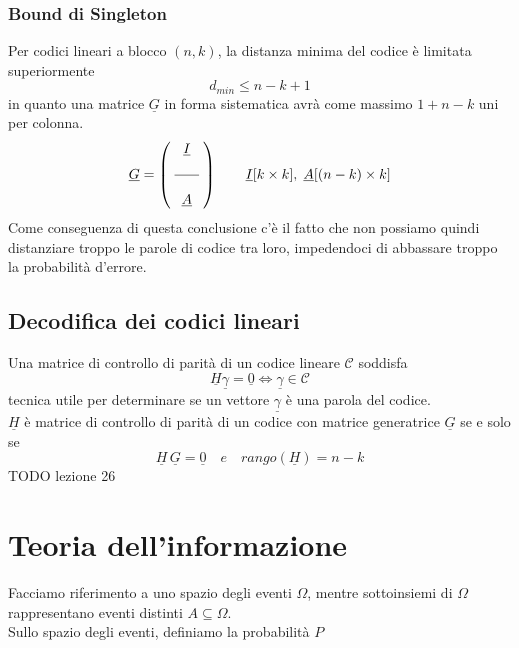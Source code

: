 \documentclass{article}
\begin{document}
\subsubsection{Bound di Singleton}
Per codici lineari a blocco $(n,k)$, la distanza minima del codice è limitata superiormente $$d_{min}\leq n-k+1$$
in quanto una matrice $\underline{G}$ in forma sistematica avrà come massimo $1+n-k$ uni per colonna.
$$\underline{G}=\left(\;\begin{array}{c}\underline{I}\\\\\hline\\\underline{A}\end{array}\;\right)\qquad\underline{I}[k\times k],\;\underline{A}[(n-k)\times k]$$
Come conseguenza di questa conclusione c'è il fatto che non possiamo quindi distanziare troppo le parole di codice tra loro, impedendoci di abbassare troppo la probabilità d'errore.\\

\subsection{Decodifica dei codici lineari}
Una matrice di controllo di parità di un codice lineare $\mathcal{C}$ soddisfa
$$\underline{H}\underline{\gamma}=\underline{0}\iff\underline{\gamma}\in\mathcal{C}$$ tecnica utile per determinare se un vettore $\underline{\gamma}$ è una parola del codice.\\
$\underline{H}$ è matrice di controllo di parità di un codice con matrice generatrice $\underline{G}$ se e solo se 
$$\underline{H}\,\underline{G}=\underline{0}\quad e \quad rango(\underline{H})=n-k$$
TODO lezione 26










\newpage
\section{Teoria dell'informazione}
Facciamo riferimento a uno spazio degli eventi $\Omega$, mentre sottoinsiemi di $\Omega$ rappresentano eventi distinti $A\subseteq\Omega$.\\
Sullo spazio degli eventi, definiamo la probabilità $P$
\end{document}
